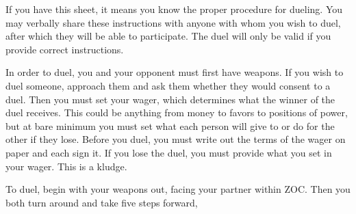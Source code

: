 \documentclass[green]{guildcamp4}
\begin{document}
\name{\gDuel{}}

If you have this sheet, it means you know the proper procedure for dueling. You may verbally share these instructions with anyone with whom you wish to duel, after which they will be able to participate. The duel will only be valid if you provide correct instructions.

In order to duel, you and your opponent must first have weapons. If you wish to duel someone, approach them and ask them whether they would consent to a duel. Then you must set your wager, which determines what the winner of the duel receives. This could be anything from money to favors to positions of power, but at bare minimum you must set what each person will give to or do for the other if they lose. Before you duel, you must write out the terms of the wager on paper and each sign it. If you lose the duel, you must provide what you set in your wager. This is a kludge.

To duel, begin with your weapons out, facing your partner within ZOC. Then you both turn around and take five steps forward, 
\end{document}
